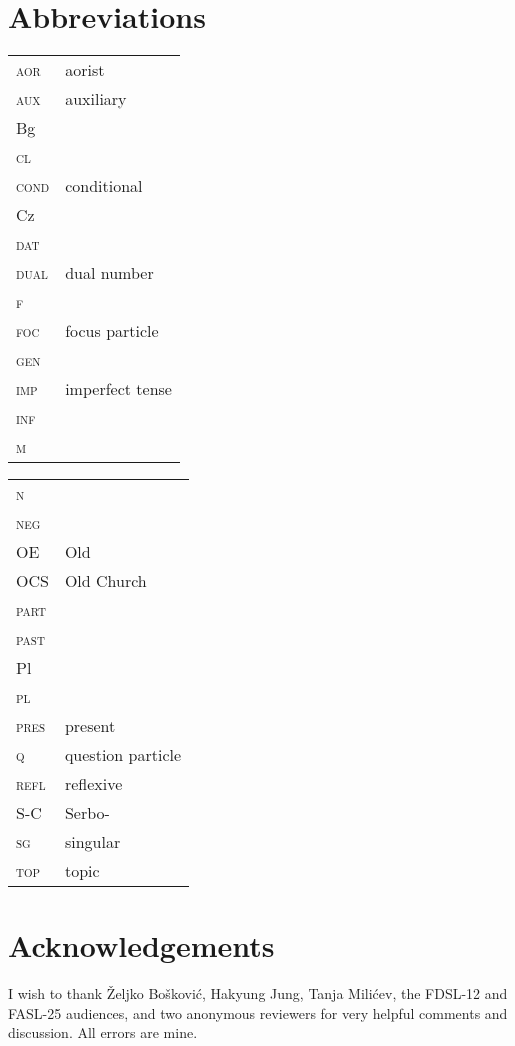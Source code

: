 \documentclass[output=paper,modfonts,newtxmath,hidelinks]{langscibook}
\begin{document}
\section*{Abbreviations}

\begin{tabularx}{.5\textwidth}{@{}lQ@{}}
\textsc{aor}&aorist\\
\textsc{aux}&auxiliary\\
Bg&\\
\textsc{cl}&\\
\textsc{cond}&conditional\\
Cz&\\
\textsc{dat}&\\ 
\textsc{dual}&dual number\\
\textsc{f}&\\
\textsc{foc}&focus particle\\
\textsc{gen}&\\
\textsc{imp}&imperfect tense\\
\textsc{inf}&\\
\textsc{m}&\\
\end{tabularx}%
\begin{tabularx}{.5\textwidth}{@{}lQ@{}}
\textsc{n}&\\
\textsc{neg}&\\
OE&Old \\
OCS&Old Church \\
\textsc{part}&\\
\textsc{past}&\\
Pl&\\
\textsc{pl}&\\
\textsc{pres}&present\\
\textsc{q}&question particle\\
\textsc{refl}&reflexive\\
S-C&Serbo-\\
\textsc{sg}&singular\\
\textsc{top}&topic\\
\end{tabularx}

\section*{Acknowledgements}

I wish to thank Željko Bošković, Hakyung Jung, Tanja Milićev, the FDSL-12 and FASL-25 audiences, and two anonymous reviewers for very helpful comments and discussion. All errors are mine.

\sloppy
\printbibliography[heading=subbibliography,notkeyword=this]
\end{document}
